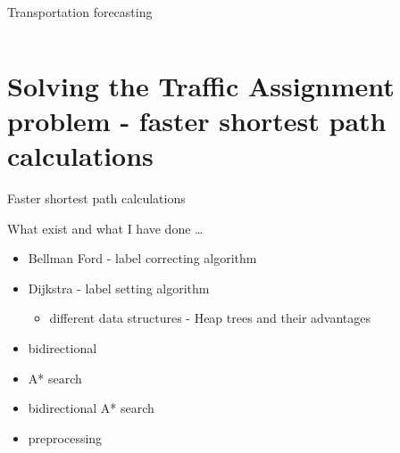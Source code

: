 \documentclass[handout]{beamer}
\begin{document}
\begin{frame}{Transportation forecasting}
\begin{columns}
    \end{columns}

\end{frame}

\section{Solving the Traffic Assignment problem - faster shortest path calculations}
\begin{frame}{Faster shortest path calculations}

    What exist and what I have done \ldots
    \begin{itemize}
        \item Bellman Ford - label correcting algorithm
        \item Dijkstra - label setting algorithm
            \begin{itemize}
                \item different data structures - Heap trees and their advantages
            \end{itemize}
        \item bidirectional
        \item A* search
        \item bidirectional A* search
        \item preprocessing
    \end{itemize}

\end{frame}
\end{document}
